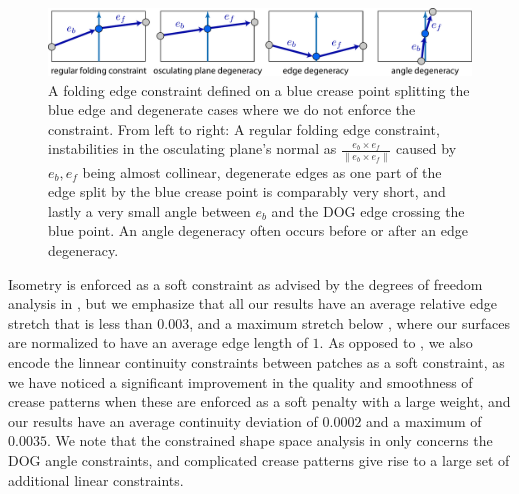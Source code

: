 \begin{figure} [h]
	\centering
	\includegraphics[width=\linewidth]{figures/fold_const_degeneracies}
	\caption{A folding edge constraint defined on a blue crease point splitting the blue edge and degenerate cases where we do not enforce the constraint. From left to right: A regular folding edge constraint, instabilities in the osculating plane's normal as $\frac{e_b \times e_f}{\|e_b \times e_f\|}$ caused by $e_b,e_f$ being almost collinear, degenerate edges as one part of the edge split by the blue crease point is comparably very short, and lastly a very small angle between $e_b$ and the DOG edge crossing the blue point. An angle degeneracy often occurs before or after an edge degeneracy.}
	\label{fig:fold_const_degeneracies}
\end{figure}


Isometry is enforced as a soft constraint as advised by the degrees of freedom analysis in \cite{rabi18,rabi2018shape}, but we emphasize that all our results have an average relative edge stretch that is less than $0.003$, and a maximum stretch below , where our surfaces are normalized to have an average edge length of $1$. As opposed to \cite{rabi2018shape}, we also encode the linnear continuity constraints between patches as a soft constraint, as we have noticed a significant improvement in the quality and smoothness of crease patterns when these are enforced as a soft penalty with a large weight, and our results have an average continuity deviation of $0.0002$ and a maximum of $0.0035$. We note that the constrained shape space analysis in \cite{rabi2018shape} only concerns the DOG angle constraints, and complicated crease patterns give rise to a large set of additional linear constraints.

